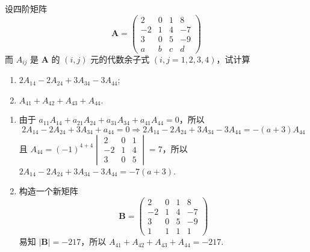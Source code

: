 \begin{example}
    设四阶矩阵 $$\boldsymbol{A}=\begin{pmatrix}
            2  & 0 & 1 & 8  \\
            -2 & 1 & 4 & -7 \\
            3  & 0 & 5 & -9 \\
            a  & b & c & d
        \end{pmatrix}$$
    而 $A_{ij}$ 是 $\boldsymbol{A}$ 的 $(i,j)$ 元的代数余子式 $(i,j=1,2,3,4)$，试计算
    \begin{enumerate}[label=(\arabic{*})]
        \item $2A_{14}-2A_{24}+3A_{34}-3A_{44}$;
        \item $A_{41}+A_{42}+A_{43}+A_{44}.$
    \end{enumerate}
\end{example}
\begin{solution}
    \begin{enumerate}[label=(\arabic{*})]
        \item 由于 $a_{11}A_{14}+a_{21}A_{24}+a_{31}A_{34}+a_{41}A_{44}=0$，所以
              $$2A_{14}-2A_{24}+3A_{34}+a_{44}=0\Rightarrow 2A_{14}-2A_{24}+3A_{34}-3A_{44}=-(a+3)A_{44}$$
              且 $\displaystyle A_{44}=(-1)^{4+4}\begin{vmatrix}
                      2  & 0 & 1 \\
                      -2 & 1 & 4 \\
                      3  & 0 & 5
                  \end{vmatrix}=7$，所以 $2A_{14}-2A_{24}+3A_{34}-3A_{44}=-7(a+3)$.
        \item 构造一个新矩阵 $$\boldsymbol{B}=\begin{pmatrix}
                      2  & 0 & 1 & 8  \\
                      -2 & 1 & 4 & -7 \\
                      3  & 0 & 5 & -9 \\
                      1  & 1 & 1 & 1
                  \end{pmatrix}$$
              易知 $|\boldsymbol{B}|=-217$，所以 $A_{41}+A_{42}+A_{43}+A_{44}=-217.$
    \end{enumerate}
\end{solution}

